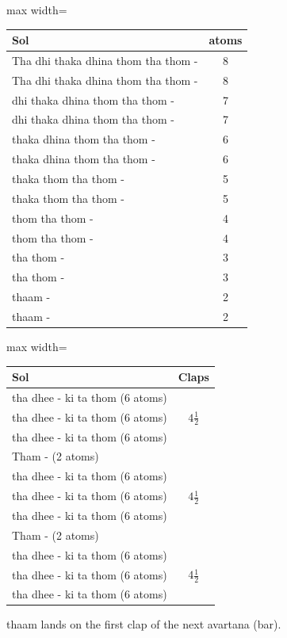 \begin{center}
\begin{adjustbox}{max width=\textwidth}
\begin{tabular}{l c}
\toprule
Sol & atoms\\
\midrule
Tha dhi thaka dhina thom tha thom - & 8\\
Tha dhi thaka dhina thom tha thom - & 8\\
dhi thaka dhina thom tha thom -     & 7\\
dhi thaka dhina thom tha thom -     & 7\\
thaka dhina thom tha thom -         & 6\\
thaka dhina thom tha thom -         & 6\\
thaka thom tha thom -               & 5\\
thaka thom tha thom -               & 5\\
thom tha thom -                     & 4\\
thom tha thom -                     & 4\\
tha thom -                          & 3\\
tha thom -                          & 3\\
thaam -                             & 2\\
thaam -                             & 2\\
\bottomrule
\end{tabular}
\end{adjustbox}
\end{center}

\begin{center}
\begin{adjustbox}{max width=\textwidth}
\begin{tabular}{l c}
\toprule
Sol & Claps\\
\midrule
tha dhee - ki ta thom (6 atoms) & \multirow{3}{*}{$4\frac{1}{2}$}\\
tha dhee - ki ta thom (6 atoms) & \\
tha dhee - ki ta thom (6 atoms) & \\
Tham - (2 atoms)                & \\
\midrule
tha dhee - ki ta thom (6 atoms) & \multirow{3}{*}{$4\frac{1}{2}$}\\
tha dhee - ki ta thom (6 atoms) & \\
tha dhee - ki ta thom (6 atoms) & \\
Tham - (2 atoms)                & \\
\midrule
tha dhee - ki ta thom (6 atoms) & \multirow{3}{*}{$4\frac{1}{2}$}\\
tha dhee - ki ta thom (6 atoms) & \\
tha dhee - ki ta thom (6 atoms) & \\
\bottomrule
\end{tabular}
\end{adjustbox}
\end{center}
thaam lands on the first clap of the next avartana (bar).
